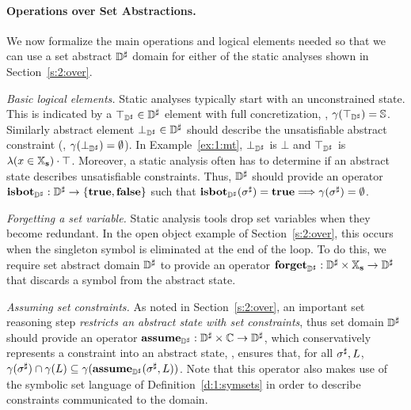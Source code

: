 \paragraph{Operations over Set Abstractions.}
We now formalize the main operations and logical elements needed so that
we can use a set abstract \( {\mathbb{D}}^{\sharp} \) domain for either of the static
analyses shown in Section~\ref{s:2:over}.
\begin{asparaitem}
\item \emph{Basic logical elements.}
  Static analyses typically start with an unconstrained state.
  This is indicated by a \( \top_{{\mathbb{D}}^{\sharp}} \in {\mathbb{D}}^{\sharp} \) element with full
  concretization, \ie, \( \gamma( \top_{{\mathbb{D}}^{\sharp}} ) = \mathbb{S} \).
  Similarly abstract element \( \bot_{{\mathbb{D}}^{\sharp}} \in {\mathbb{D}}^{\sharp} \) should describe
  the unsatisfiable abstract constraint (\ie, \( \gamma( \bot_{{\mathbb{D}}^{\sharp}} ) =
  \emptyset \)).
  In Example~\ref{ex:1:mt}, \( \bot_{{\mathbb{D}}^{\sharp}} \) is \( \bot \) and \( \top_{{\mathbb{D}}^{\sharp}} \)
  is \( \lambda (x \in \mathbb{X}_{\bf s}) \cdot \top \).
  Moreover, a static analysis often has to determine if an abstract state
  describes unsatisfiable constraints.
  Thus, \( {\mathbb{D}}^{\sharp} \) should provide an operator \( \textbf{isbot}_{{\mathbb{D}}^{\sharp}}: {\mathbb{D}}^{\sharp}
  \rightarrow \{ \mathbf{true}, \mathbf{false} \} \) such that \( \textbf{isbot}_{{\mathbb{D}}^{\sharp}}( {\sigma}^{\sharp} )
  = \mathbf{true} \Longrightarrow \gamma( {\sigma}^{\sharp} ) = \emptyset \).

\item \emph{Forgetting a set variable.}
  Static analysis tools drop set variables when they become redundant.
  In the open object example of Section~\ref{s:2:over}, this occurs when
  the singleton symbol is eliminated at the end of the loop.
  To do this, we require set abstract domain \( {\mathbb{D}}^{\sharp} \) to provide
  an operator \( \textbf{forget}_{{\mathbb{D}}^{\sharp}}: {\mathbb{D}}^{\sharp} \times \mathbb{X}_{\bf s} \rightarrow {\mathbb{D}}^{\sharp} \)
  that discards a symbol from the abstract state.

\item \emph{Assuming set constraints.}
  As noted in Section~\ref{s:2:over}, an important set reasoning step
  {\em restricts an abstract state with set constraints}, thus set
  domain \( {\mathbb{D}}^{\sharp} \) should provide an operator \( \textbf{assume}_{{\mathbb{D}}^{\sharp}}: {\mathbb{D}}^{\sharp}
  \times \mathbb{C} \rightarrow {\mathbb{D}}^{\sharp} \), which conservatively represents
  a constraint into an abstract state, \ie, ensures that, for all
  \( {\sigma}^{\sharp}, L \), \( \gamma( {\sigma}^{\sharp} ) \cap \gamma( L ) \subseteq
  \gamma( \textbf{assume}_{{\mathbb{D}}^{\sharp}}( {\sigma}^{\sharp}, L ) ) \).
  Note that this operator also makes use of the symbolic set language
  of Definition~\ref{d:1:symsets} in order to describe constraints
  communicated to the domain.
  

\end{asparaitem}
